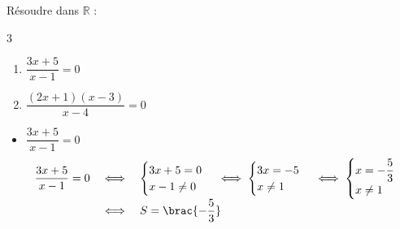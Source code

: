 \begin{methode}
	Résoudre dans $\mathbb{R}$ :
	\begin{multicols}{3}
		\begin{enumerate}
			\item $\dfrac{3x+5}{x-1} = 0$
			\item $\dfrac{(2x+1)(x-3)}{x-4} = 0$
		\end{enumerate}
	\end{multicols}

	\begin{correction}
		\nline
		\begin{itemize}
			\item $\dfrac{3x+5}{x-1} = 0$
			      \[
				      \begin{array}{rcl}
					      \dfrac{3x+5}{x-1} = 0 & \iff & \begin{cases}
						                                     3x + 5 = 0 \\
						                                     x - 1 \neq 0
					                                     \end{cases} \iff \begin{cases}
						                                                      3x = -5 \\
						                                                      x \neq 1
					                                                      \end{cases} \iff \begin{cases}
						                                                                       x = -\dfrac{5}{3} \\[1mm]
						                                                                       x \neq 1
					                                                                       \end{cases} \\ %
					                            & \iff & S = \brac{-\dfrac{5}{3}}
				      \end{array}
			      \]


\end{itemize}
\end{correction}
\end{methode}
